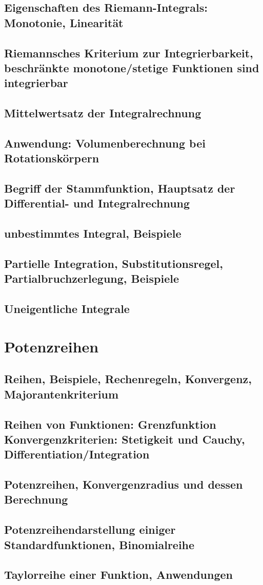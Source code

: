 \subsection{Eigenschaften des Riemann-Integrals: Monotonie, Linearität}
\subsection{Riemannsches Kriterium zur Integrierbarkeit, beschränkte monotone/stetige Funktionen sind integrierbar}
\subsection{Mittelwertsatz der Integralrechnung}
\subsection{Anwendung: Volumenberechnung bei Rotationskörpern}
\subsection{Begriff der Stammfunktion, Hauptsatz der Differential- und Integralrechnung}
\subsection{unbestimmtes Integral, Beispiele}
\subsection{Partielle Integration, Substitutionsregel, Partialbruchzerlegung, Beispiele}
\subsection{Uneigentliche Integrale}

\section{Potenzreihen}
\subsection{Reihen, Beispiele, Rechenregeln, Konvergenz, Majorantenkriterium}
\subsection{Reihen von Funktionen:
Grenzfunktion
Konvergenzkriterien:
Stetigkeit
und
Cauchy,
Differentiation/Integration}
\subsection{Potenzreihen, Konvergenzradius und dessen Berechnung}
\subsection{Potenzreihendarstellung einiger Standardfunktionen, Binomialreihe}
\subsection{Taylorreihe einer Funktion, Anwendungen}
